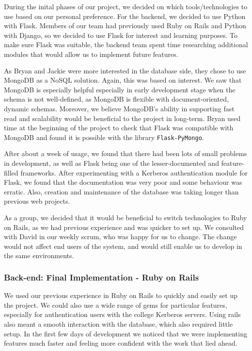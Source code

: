 \documentclass[a4paper, titlepage]{article}
\begin{document}
During the inital phases of our project, we decided on which tools/technologies to use based on our personal preference. For the backend, we decided to use Python with Flask. Members of our team had previously used Ruby on Rails and Python with Django, so we decided to use Flask for interest and 
learning purposes. To make sure Flask was suitable, the backend team spent time researching additional 
modules that would allow us to implement future features.


As Bryan and Jackie were more interested in the database side, they chose to use MongoDB as a NoSQL
solution. Again, this was based on interest. We saw that MongoDB is  especially helpful especially in 
early development stage when the schema is not well-defined, as MongoDB is flexible with 
document-oriented, dynamic schemas. Moreover, we believe MongoDB's ability in supporting fast read and 
scalability would be beneficial to the project in long-term. Bryan used time at the beginning of the 
project to check that Flask was compatible with MongoDB and found it is possible with the library 
\texttt{Flask-PyMongo}.


After about a week of usage, we found that there had been lots of small problems in development, as 
well as Flask being one of the lesser-documented and feature-filled frameworks. After experimenting 
with a Kerberos authentication module for Flask, we found that the documentation was very poor and some 
behaviour was erratic. Also, creation and maintenance of the database was taking longer than previous 
web projects. 

As a group, we decided that it would be beneficial to switch technologies to Ruby on Rails, as we had
previous experience and was quicker to set up. We consulted with David in our weekly scrum, who was
happy for us to change. The change would not affect end users of the system, and would still enable us 
to develop in the same environments. 

\subsubsection{Back-end: Final Implementation - Ruby on Rails} \label{sec:impl_RoR}

We used our previous experience in Ruby on Rails to quickly and easily set up the project. We could also
use a wide range of gems for particular features, especially for authentication users with the college
Kerberos servers. Using rails also meant a smooth interaction with the database, which also required 
little setup. In the first few days of development we noticed that we were implementing features much
faster and feeling more confident with the work that lied ahead. 
\end{document}
